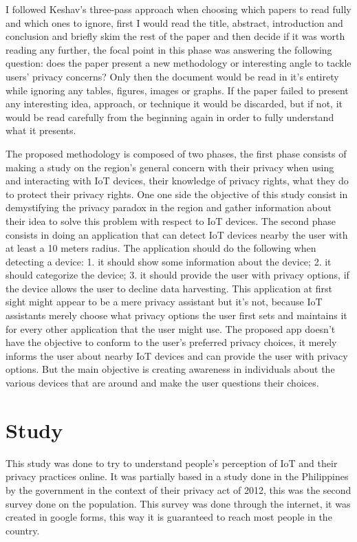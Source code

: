 \documentclass[conference]{IEEEtran}
\begin{document}
I followed Keshav's three-pass approach \cite{KeshavHow} when choosing which
papers to read fully and which ones to ignore, first I would read the title, abstract,
introduction and conclusion and briefly skim the rest of the paper and then
decide if it was worth reading any further, the focal point in this phase was
answering the following question: does the paper present a new methodology or
interesting angle to tackle users' privacy concerns? Only then the document would
be read in it's entirety while ignoring any tables, figures, images or graphs.
If the paper failed to present any interesting idea, approach, or
technique it would be discarded, but if not, it would be read carefully from
the beginning again in order to fully understand what it presents.

The proposed methodology is composed of two phases, the first phase consists of
making a study on the region's general concern with their privacy when
using and interacting with IoT devices, their knowledge of privacy rights, what they do to
protect their privacy rights. One one side the objective of this study
consist in demystifying the privacy paradox in the region and gather
information about their idea to solve this problem with respect
to IoT devices.
The second phase consists in doing an application that can detect IoT devices
nearby the user with at least a 10 meters radius. The application should
do the following when detecting a device:
1. it should show some information about the device;
2. it should categorize the device;
3. it should provide the user with privacy options, if the device allows the
user to decline data harvesting.
This application at first sight might appear to be a mere privacy assistant but
it's not, because IoT assistants merely choose what privacy options
the user first sets and maintains it for every other application that the user
might use. The proposed app doesn't have the objective to conform to the
user's preferred privacy choices, it merely informs the user about nearby IoT
devices and can provide the user with privacy options. But the main objective
is creating awareness in individuals about the various devices that are around
and make the user questions their choices.

\section{Study}

This study was done to try to understand people's perception of IoT and their
privacy practices online. It was partially based in a study done in the Philippines by the
government in the context of their privacy act of 2012, this was the second survey done
on the population.
This survey was done through the internet, it was created in google forms, this way it
is guaranteed to reach most people in the country.
\end{document}
